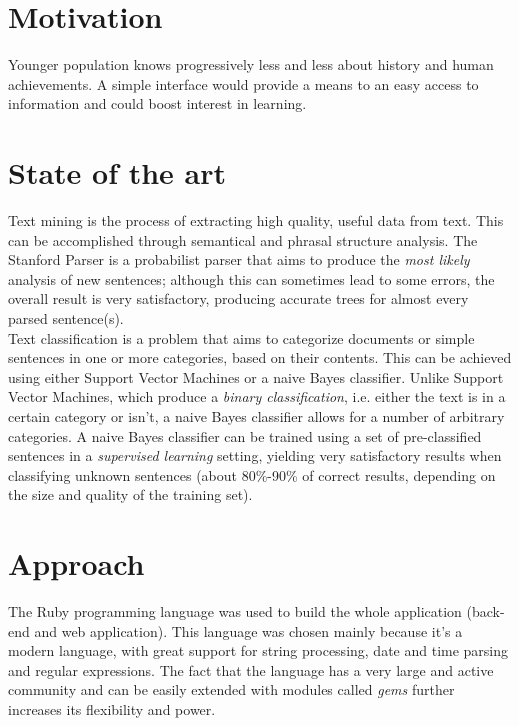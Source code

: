 \documentclass{llncs}
\begin{document}
\section{Motivation}

Younger population knows progressively less and less about history and human achievements. A simple interface would provide a means to an easy access to information and could boost interest in learning.\\

\section{State of the art}

Text mining is the process of extracting high quality, useful data from text. This can be accomplished through semantical and phrasal structure analysis. The Stanford Parser is a probabilist parser that aims to produce the \textit{most likely} analysis of new sentences; although this can sometimes lead to some errors, the overall result is very satisfactory, producing accurate trees for almost every parsed sentence(s).\\

Text classification is a problem that aims to categorize documents or simple sentences in one or more categories, based on their contents. This can be achieved using either Support Vector Machines or a naive Bayes classifier. Unlike Support Vector Machines, which produce a \textit{binary classification}, i.e. either the text is in a certain category or isn't, a naive Bayes classifier allows for a number of arbitrary categories. A naive Bayes classifier can be trained using a set of pre-classified sentences in a \textit{supervised learning} setting, yielding very satisfactory results when classifying unknown sentences (about 80\%-90\% of correct results, depending on the size and quality of the training set).

\section{Approach}

The Ruby programming language was used to build the whole application (back-end and web application). This language was chosen mainly because it's a modern language, with great support for string processing, date and time parsing and regular expressions. The fact that the language has a very large and active community and can be easily extended with modules called \textit{gems} further increases its flexibility and power.
\end{document}

